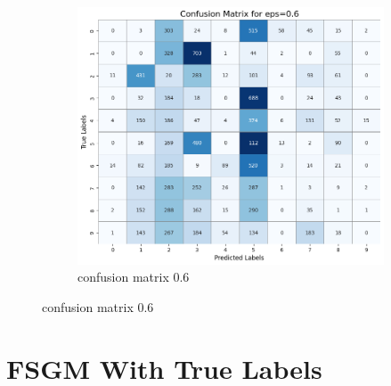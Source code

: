 \documentclass[11pt,onside]{article}
\begin{document}
\begin{figure}[h]
  \centering
  \begin{subfigure}[b]{0.49\textwidth}
    \centering
    \includegraphics[width=\textwidth]{V2_images/confusion_matrix_eps_0.6.png}
    \caption{confusion matrix 0.6}
    \label{fig:image1}
  \end{subfigure}
 
\end{figure}
\clearpage %


\section{FSGM With True Labels}
\end{document}
